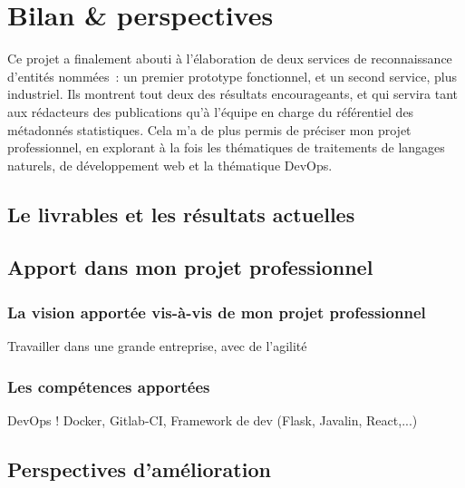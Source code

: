 \section{Bilan \& perspectives}
Ce projet a finalement abouti à l'élaboration de deux services de reconnaissance d'entités nommées~: un premier prototype fonctionnel, et un second service, plus industriel. Ils montrent tout deux des résultats encourageants, et qui servira tant aux rédacteurs des publications qu'à l'équipe en charge du référentiel des métadonnés statistiques. Cela m'a de plus permis de préciser mon projet professionnel, en explorant à la fois les thématiques de traitements de langages naturels, de développement web et la thématique DevOps.

\subsection{Le livrables et les résultats actuelles}


\subsection{Apport dans mon projet professionnel}

\subsubsection{La vision apportée vis-à-vis de mon projet professionnel}
Travailler dans une grande entreprise, avec de l'agilité

\subsubsection{Les compétences apportées}
DevOps ! Docker, Gitlab-CI, Framework de dev (Flask, Javalin, React,...)

\subsection{Perspectives d'amélioration}